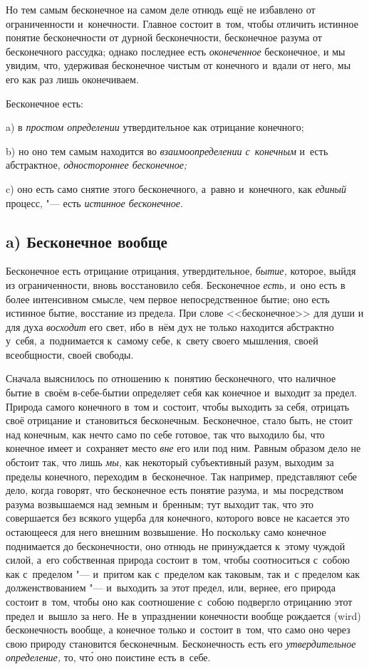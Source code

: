 Но тем самым бесконечное на самом деле отнюдь ещё не избавлено от
ограниченности и~конечности. Главное состоит в~том, чтобы отличить истинное
понятие бесконечности от дурной бесконечности, бесконечное разума от
бесконечного рассудка; однако последнее есть {\em оконеченное} бесконечное, и
мы увидим, что, удерживая бесконечное чистым от конечного и~вдали от него, мы
его как раз лишь оконечиваем.

Бесконечное есть:

a) в {\em простом определении} утвердительное как отрицание конечного;

b) но оно тем самым находится во {\em взаимоопределении
с~конечным} и~есть абстрактное, {\em одностороннее бесконечное;}

c) оно есть само снятие этого бесконечного, а~равно и~конечного, как
{\em единый} процесс, "--- есть {\em истинное бесконечное}.

\subsection[a) Бесконечное вообще]{a) Бесконечное вообще}

Бесконечное есть отрицание отрицания, утвердительное,
{\em бытие,} которое, выйдя из ограниченности, вновь
восстановило себя. Бесконечное {\em есть,} и~оно есть в
более интенсивном смысле, чем первое непосредственное бытие; оно есть
истинное бытие, восстание из предела. При слове <<бесконечное>> для души и
для духа {\em восходит} его свет, ибо в~нём дух не
только находится абстрактно у~себя, а~поднимается к~самому себе, к~свету
своего мышления, своей всеобщности, своей свободы.

Сначала выяснилось по отношению к~понятию бесконечного, что наличное бытие
в~своём в-себе-бытии определяет себя как конечное и~выходит за предел. Природа
самого конечного в~том и~состоит, чтобы выходить за себя, отрицать своё
отрицание и~становиться бесконечным. Бесконечное, стало быть, не стоит над
конечным, как нечто само по себе готовое, так что выходило бы, что конечное
имеет и~сохраняет место {\em вне} его или под ним. Равным образом дело не
обстоит так, что лишь {\em мы,} как некоторый субъективный разум, выходим за
пределы конечного, переходим в~бесконечное. Так например, представляют себе
дело, когда говорят, что бесконечное есть понятие разума, и~мы посредством
разума возвышаемся над земным и~бренным; тут выходит так, что это совершается
без всякого ущерба для конечного, которого вовсе не касается это остающееся для
него внешним возвышение. Но поскольку само конечное поднимается до
бесконечности, оно отнюдь не принуждается к~этому чуждой силой, а~его
собственная природа состоит в~том, чтобы соотноситься с~собою как с~пределом
"--- и~притом как с~пределом как таковым, так и~с пределом как долженствованием
"--- и~выходить за этот предел, или, вернее, его природа состоит в~том, чтобы
оно как соотношение с~собою подвергло отрицанию этот предел и~вышло за него. Не
в~упразднении конечности вообще рождается (wird) бесконечность вообще, а
конечное только и~состоит в~том, что само оно через свою природу становится
бесконечным. Бесконечность есть его {\em утвердительное определение,}
то, чт\'{о} оно поистине есть в~себе.

